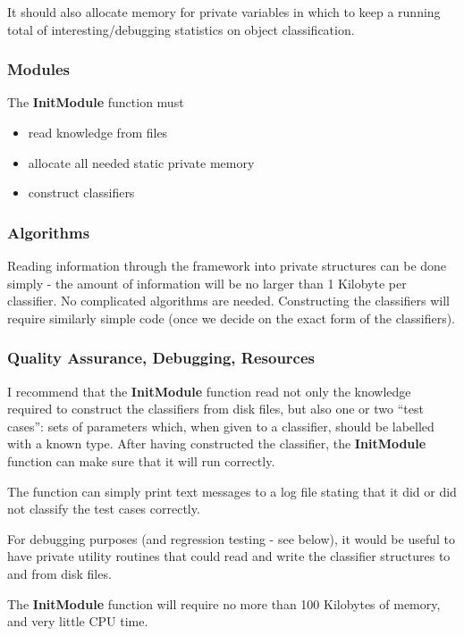   It should also allocate memory for private variables in 
which to keep a running total of interesting/debugging 
statistics on object classification.

\subsubsection {Modules}

  The {\bf InitModule} function must

\begin {itemize}
   \item read knowledge from files
   \item allocate all needed static private memory 
   \item construct classifiers
\end {itemize}

\subsubsection {Algorithms}

  Reading information through the framework into private
structures can be done simply - the amount of information will
be no larger than 1 Kilobyte per classifier.  No complicated
algorithms are needed.  Constructing the classifiers will 
require similarly simple code (once we decide on the exact
form of the classifiers).

\subsubsection {Quality Assurance, Debugging, Resources}

  I recommend that the {\bf InitModule} function read not
only the knowledge required to construct the classifiers
from disk files, but also one or two ``test cases'': 
sets of parameters which, when given to a classifier, 
should be labelled with a known type.  After having 
constructed the classifier, the {\bf InitModule}
function can make sure that it will run correctly.

  The function can simply print text messages to a log
file stating that it did or did not classify the test
cases correctly.

  For debugging purposes (and regression testing -
see below), it would be useful to 
have private utility routines that could read and write
the classifier structures to and from disk files.

  The {\bf InitModule} function will require no more
than 100 Kilobytes of memory, and very little CPU time.

